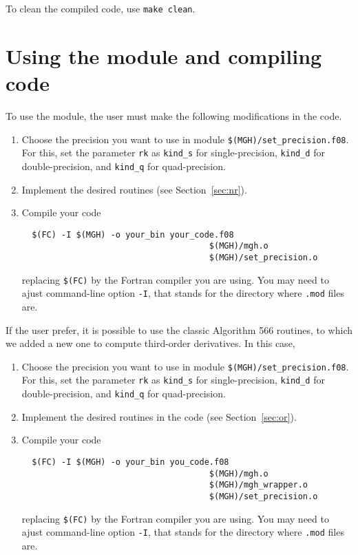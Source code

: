 \documentclass[11pt]{article}
\begin{document}
To clean the compiled code, use \verb|make clean|.

\section{Using the module and compiling code}

To use the module, the user must make the following modifications in
the code.

\begin{enumerate}

\item Choose the precision you want to use in module
  \verb|$(MGH)/set_precision.f08|. For this, set the parameter
  \verb|rk| as \verb|kind_s| for single-precision, \verb|kind_d| for
  double-precision, and \verb|kind_q| for quad-precision.

\item Implement the desired routines (see Section~\ref{sec:nr}).

\item Compile your code
\begin{verbatim}
  $(FC) -I $(MGH) -o your_bin your_code.f08 
                                      $(MGH)/mgh.o
                                      $(MGH)/set_precision.o
\end{verbatim}
replacing \verb|$(FC)| by the Fortran compiler you are using. You may
need to ajust command-line option \verb|-I|, that stands for the
directory where \verb|.mod| files are.
\end{enumerate}

If the user prefer, it is possible to use the classic Algorithm 566
routines, to which we added a new one to compute third-order
derivatives. In this case,

\begin{enumerate}

\item Choose the precision you want to use in module
  \verb|$(MGH)/set_precision.f08|. For this, set the parameter
  \verb|rk| as \verb|kind_s| for single-precision, \verb|kind_d| for
  double-precision, and \verb|kind_q| for quad-precision.

\item Implement the desired routines in the code (see
  Section~\ref{sec:or}).

\item Compile your code
\begin{verbatim}
  $(FC) -I $(MGH) -o your_bin you_code.f08
                                      $(MGH)/mgh.o
                                      $(MGH)/mgh_wrapper.o
                                      $(MGH)/set_precision.o
\end{verbatim}
replacing \verb|$(FC)| by the Fortran compiler you are using. You may
need to ajust command-line option \verb|-I|, that stands for the
directory where \verb|.mod| files are.

\end{enumerate}
\end{document}
